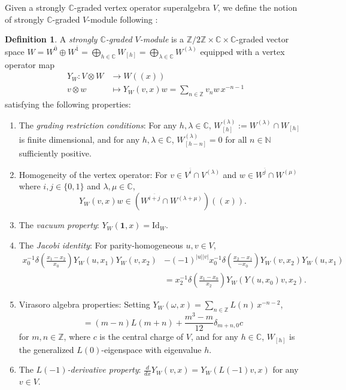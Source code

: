 \documentclass[11pt, reqno]{amsart}
\theoremstyle{definition}\newtheorem{defi}[thm]{Definition}
\theoremstyle{definition}\newtheorem{rem}[thm]{Remark}
\theoremstyle{definition}\newtheorem{exam}[thm]{Example}
\theoremstyle{definition}\newtheorem{assum}[thm]{Assumption}
\newcommand{\CC}{\mathbb{C}}
\newcommand{\ZZ}{\mathbb{Z}}
\newcommand{\NN}{\mathbb{N}}
\newcommand{\Id}{\mathrm{Id}}
\newcommand{\vac}{\mathbf{1}}
\newcommand{\even}{\overline{0}}
\newcommand{\odd}{\overline{1}}
\begin{document}
Given a strongly $\CC$-graded vertex operator superalgebra $V$, we define the notion of strongly $\CC$-graded $V$-module following \cite[Definition 2.25]{HLZ1}:
\begin{defi}\label{def:strongly_graded}
A \textit{strongly $\CC$-graded $V$-module} is a $\ZZ/2\ZZ\times\CC\times\CC$-graded vector space $W=W^{\even}\oplus W^{\odd} =\bigoplus_{h\in\CC} W_{[h]}=\bigoplus_{\lambda\in\CC} W^{(\lambda)}$ equipped with a vertex operator map
\begin{align*}
Y_W: V\otimes W & \rightarrow W((x))\nonumber\\
 v\otimes w & \mapsto Y_W(v,x)w=\sum_{n\in\ZZ} v_n w\,x^{-n-1}
\end{align*}
satisfying the following properties:
\begin{enumerate}

\item The \textit{grading restriction conditions}: For any $h,\lambda\in\CC$, $W^{(\lambda)}_{[h]}:= W^{(\lambda)}\cap W_{[h]}$ is finite dimensional, and for any $h,\lambda\in\CC$, $W^{(\lambda)}_{[h-n]}=0$ for all $n\in\NN$ sufficiently positive.

\item Homogeneity of the vertex operator: For $v\in V^{\overline{i}}\cap V^{(\lambda)}$ and $w\in W^{\overline{j}}\cap W^{(\mu)}$ where $i,j\in\lbrace 0,1\rbrace$ and $\lambda,\mu\in\CC$, 
\begin{equation*}
Y_W(v,x)w\in (W^{\overline{i+j}}\cap W^{(\lambda+\mu)})((x)).
\end{equation*}


\item The \textit{vacuum property}: $Y_W(\vac,x) =\Id_{W}$.

\item The \textit{Jacobi identity}: For parity-homogeneous $u,v\in V$,
\begin{align*}
x_0^{-1}\delta\left(\frac{x_1-x_2}{x_0}\right) Y_W(u,x_1)Y_W(v,x_2) & - (-1)^{\vert u\vert\vert v\vert} x_0^{-1}\delta\left(\frac{x_2-x_1}{-x_0}\right) Y_W(v,x_2)Y_W(u,x_1)\nonumber\\
& = x_2^{-1}\delta\left(\frac{x_1-x_0}{x_2}\right) Y_W(Y(u,x_0)v,x_2).
\end{align*}

\item Virasoro algebra properties: Setting $Y_W(\omega,x)=\sum_{n\in\ZZ} L(n)\,x^{-n-2}$, 
\begin{equation*}
[L(m),L(n)] =(m-n)L(m+n)+\frac{m^3-m}{12}\delta_{m+n,0}c
\end{equation*}
for $m,n\in\ZZ$, where $c$ is the central charge of $V$, and for any $h\in\CC$, $W_{[h]}$ is the generalized $L(0)$-eigenspace with eigenvalue $h$.

\item The \textit{$L(-1)$-derivative property}: $\frac{d}{dx}Y_W(v,x)=Y_W(L(-1)v,x)$ for any $v\in V$.

\end{enumerate}
\end{defi}
\end{document}

